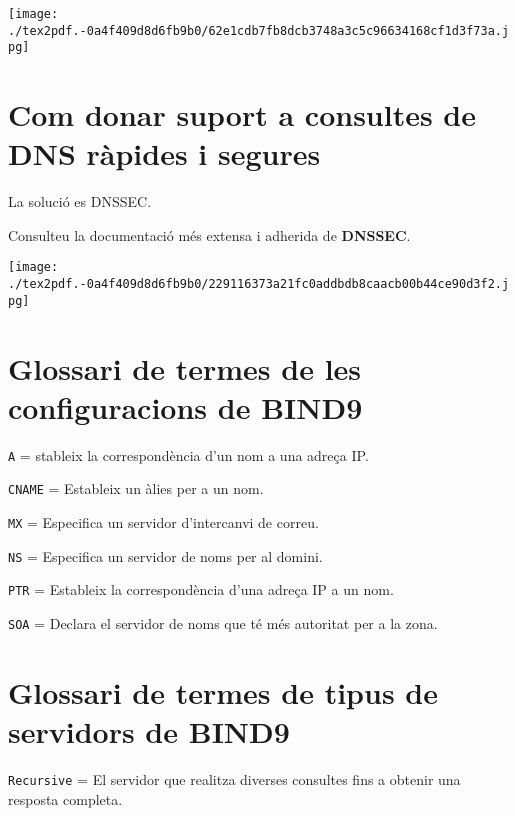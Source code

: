 \documentclass[]{article}
\begin{document}
\texttt{[image: ./tex2pdf.-0a4f409d8d6fb9b0/62e1cdb7fb8dcb3748a3c5c96634168cf1d3f73a.jpg]}

\hypertarget{com-donar-suport-a-consultes-de-dns-ruxe0pides-i-segures}{%
\section{\texorpdfstring{\textbf{Com donar suport a consultes de DNS
ràpides i
segures}}{Com donar suport a consultes de DNS ràpides i segures}}\label{com-donar-suport-a-consultes-de-dns-ruxe0pides-i-segures}}

La solució es DNSSEC.

Consulteu la documentació més extensa i adherida de \textbf{DNSSEC}.

\texttt{[image: ./tex2pdf.-0a4f409d8d6fb9b0/229116373a21fc0addbdb8caacb00b44ce90d3f2.jpg]}

\hypertarget{glossari-de-termes-de-les-configuracions-de-bind9}{%
\section{\texorpdfstring{\textbf{Glossari de termes de les
configuracions de
BIND9}}{Glossari de termes de les configuracions de BIND9}}\label{glossari-de-termes-de-les-configuracions-de-bind9}}

\texttt{A} = stableix la correspondència d'un nom a una adreça IP.

\texttt{CNAME} = Estableix un àlies per a un nom.

\texttt{MX} = Especifica un servidor d'intercanvi de correu.

\texttt{NS} = Especifica un servidor de noms per al domini.

\texttt{PTR} = Estableix la correspondència d'una adreça IP a un nom.

\texttt{SOA} = Declara el servidor de noms que té més autoritat per a la
zona.

\hypertarget{glossari-de-termes-de-tipus-de-servidors-de-bind9}{%
\section{\texorpdfstring{\textbf{Glossari de termes de tipus de
servidors de
BIND9}}{Glossari de termes de tipus de servidors de BIND9}}\label{glossari-de-termes-de-tipus-de-servidors-de-bind9}}

\texttt{Recursive} = El servidor que realitza diverses consultes fins a
obtenir una resposta completa.
\end{document}
